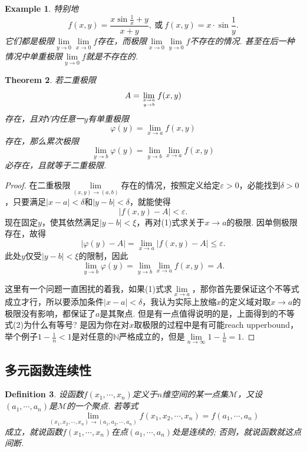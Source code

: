 \documentclass{article}
\newtheorem{theorem}{Theorem}[section]
\newtheorem{example}[theorem]{Example}
\newtheorem{definition}[theorem]{Definition}
\begin{document}
\begin{example}
\rm 特别地
$$
f(x,y) = \frac{x\sin\frac{1}{x} + {y}}{x+y},~\text{或}~f(x,y)= x \cdot \sin\frac{1}{y}.
$$
它们都是极限$\lim\limits_{y \rightarrow 0}\lim\limits_{x \rightarrow 0}f$存在，而极限$\lim\limits_{x \rightarrow 0}\lim\limits_{y \rightarrow 0}f$不存在的情况. 甚至在后一种情况中单重极限$\lim\limits_{y \rightarrow 0}f$就是不存在的.
\end{example}

\begin{theorem}
\rm 若二重极限
$$
A = \lim\limits_{x \rightarrow a \atop y \rightarrow b}f(x,y)
$$
存在，且对$Y$内任意一$y$有单重极限
$$
\varphi(y) = \lim\limits_{x \rightarrow a}f(x,y)
$$
存在，那么累次极限
$$
\lim\limits_{y \rightarrow b}\varphi(y) = \lim\limits_{y \rightarrow b}\lim\limits_{x \rightarrow a}f(x,y)
$$
必存在，且就等于二重极限.
\end{theorem}

\begin{proof}
在二重极限$\lim\limits_{(x,y) \to (a,b)}$存在的情况，按照定义给定$\varepsilon >0$，必能找到$\delta > 0$，只要满足$|x - a| < \delta$和$|y-b| < \delta$，就能使得
\begin{equation}
|f(x,y) - A| < \varepsilon.
\end{equation}
现在固定$y$，使其依然满足$|y-b| < \xi$，再对(1)式求关于$x \to a$的极限. 因单侧极限存在，故得
\begin{equation}
|\varphi(y)-A| = \lim\limits_{x \to a}|f(x,y) - A|  \leq \varepsilon.
\end{equation}
此处$y$仅受$|y-b| < \xi$的限制，因此
$$
\lim\limits_{y \to b}\varphi(y) = \lim\limits_{y \to b}\lim\limits_{x \to a}f(x,y) = A.
$$

这里有一个问题一直困扰的着我，如果(1)式求$\lim\limits_{x \rightarrow a}$，那你首先要保证这个不等式成立才行，所以要添加条件$|x -a | < \delta$，我认为实际上放缩$x$的定义域对取$x \rightarrow a$的极限没有影响，都保证了$a$是其聚点. {\color{blue}但是有一点值得说明的是，上面得到的不等式(2)为什么有等号?} 是因为你在对$x$取极限的过程中是有可能reach upperbound，举个例子$1-\frac{1}{n} < 1$是对任意的$\mathbb{N}$严格成立的，但是$\lim\limits_{n \rightarrow \infty} 1-\frac{1}{n} = 1$. 
\end{proof}

\subsection{多元函数连续性}

\begin{definition}
\rm 设函数$f(x_1,\cdots,x_n)$定义于$n$维空间的某一点集$\mathcal{M}$，又设$(a_1,\cdots,a_n)$是$\mathcal{M}$的一个聚点. 若等式
$$
\lim\limits_{(x_1,x_2,\cdots,x_n) \to (a_1,a_2,\cdots,a_n)}f(x_1,x_2,\cdots,x_n) = f(a_1,\cdots,a_n)
$$
成立，就说函数$f(x_1,\cdots,x_n)$在点$(a_1,\cdots,a_n)$处是连续的; 否则，就说函数就这点间断. 
\end{definition}
\end{document}
